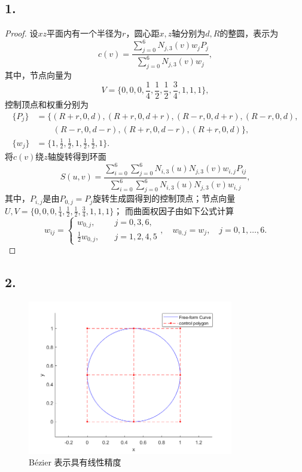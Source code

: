 \documentclass[utf8]{ctexart}
\begin{document}
\subsection*{1.}
\begin{proof}
设$xz$平面内有一个半径为$r$，圆心距$x,z$轴分别为$d,R$的整圆，表示为
$$
c(v) = \frac{\sum_{j=0}^6N_{j,3}(v)w_jP_j}{\sum_{j=0}^6N_{j,3}(v)w_j},
$$
其中，节点向量为
$$
V =  \{0, 0, 0, \frac{1}{4}, \frac{1}{2}, \frac{1}{2}, \frac{3}{4}, 1, 1, 1\},
$$
控制顶点和权重分别为
$$
\begin{aligned}
    \{P_{j}\} &= \{(R+r, 0, d), (R+r, 0, d + r), (R - r, 0, d + r), (R-r, 0, d), \\
    &\qquad (R - r, 0, d - r), (R + r, 0, d - r), (R+r, 0, d)\},\\
    \{w_j\} &= \{1, \frac{1}{2}, \frac{1}{2}, 1, \frac{1}{2}, \frac{1}{2}, 1\}.
\end{aligned}
$$
将$c(v)$绕$z$轴旋转得到环面
$$
S(u, v) = \frac{\sum_{i=0}^6\sum_{j=0}^6N_{i,3}(u)N_{j,3}(v)w_{i,j}P_{ij}}{\sum_{i=0}^6\sum_{j=0}^6N_{i,3}(u)N_{j,3}(v)w_{i,j}},
$$
其中，$P_{i,j}$是由$P_{0, j} = P_j$旋转生成圆得到的控制顶点；节点向量
$U,V = \{0, 0, 0, \frac{1}{4}, \frac{1}{2}, \frac{1}{2}, \frac{3}{4}, 1, 1, 1\}$；
而曲面权因子由如下公式计算
$$
w_{ij} =
\begin{cases}
    w_{0, j},\quad &j = 0, 3, 6,\\
    \frac{1}{2}w_{0,j}, \quad & j = 1,2,4,5
\end{cases},\quad
w_{0,j} = w_j, \quad j = 0,1,\dots,6.
$$

\end{proof}

\subsection*{2.}
\begin{figure}[H]
    \centering
    \includegraphics[width=0.8\textwidth]{ffd_1.png}
    \caption{Bézier 表示具有线性精度}
    \label{fig: ffd_1}
\end{figure}
\end{document}
